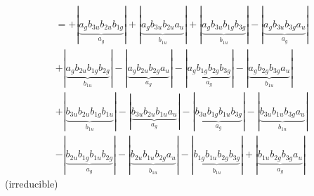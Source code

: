 \documentclass{article}
\begin{document}
\begin{multline*}
\end{multline*}\begin{multline*}
=+\left|\underbrace{a_{g} b_{3u} b_{2u} b_{1g}}_{a_{g}}\right|+\left|\underbrace{a_{g} b_{3u} b_{2u} a_{u}}_{b_{1u}}\right|+\left|\underbrace{a_{g} b_{3u} b_{1g} b_{3g}}_{b_{1u}}\right|-\left|\underbrace{a_{g} b_{3u} b_{3g} a_{u}}_{a_{g}}\right|\\
+\left|\underbrace{a_{g} b_{2u} b_{1g} b_{2g}}_{b_{1u}}\right|-\left|\underbrace{a_{g} b_{2u} b_{2g} a_{u}}_{a_{g}}\right|-\left|\underbrace{a_{g} b_{1g} b_{2g} b_{3g}}_{a_{g}}\right|-\left|\underbrace{a_{g} b_{2g} b_{3g} a_{u}}_{b_{1u}}\right|\\
+\left|\underbrace{b_{3u} b_{2u} b_{1g} b_{1u}}_{b_{1u}}\right|-\left|\underbrace{b_{3u} b_{2u} b_{1u} a_{u}}_{a_{g}}\right|-\left|\underbrace{b_{3u} b_{1g} b_{1u} b_{3g}}_{a_{g}}\right|-\left|\underbrace{b_{3u} b_{1u} b_{3g} a_{u}}_{b_{1u}}\right|\\
-\left|\underbrace{b_{2u} b_{1g} b_{1u} b_{2g}}_{a_{g}}\right|-\left|\underbrace{b_{2u} b_{1u} b_{2g} a_{u}}_{b_{1u}}\right|-\left|\underbrace{b_{1g} b_{1u} b_{2g} b_{3g}}_{b_{1u}}\right|+\left|\underbrace{b_{1u} b_{2g} b_{3g} a_{u}}_{a_{g}}\right|
\end{multline*}(irreducible)\\ \\
\vspace{0.5cm}
\end{document}
